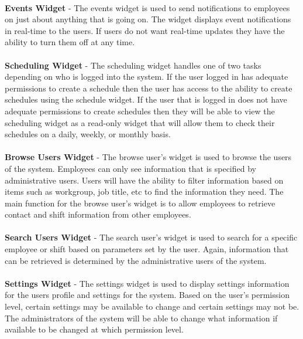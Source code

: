 \documentclass[letterpaper,12pt]{report}
\begin{document}
\paragraph*{}\hspace{0.6cm}\textbf{Events Widget} - The events widget is used to send notifications to employees on just about anything that is going on. The widget displays event notifications in real-time to the users. If users do not want real-time updates they have the ability to turn them off at any time.
\paragraph*{}\hspace{0.6cm}\textbf{Scheduling Widget} - The scheduling widget handles one of two tasks depending on who is logged into the system. If the user logged in has adequate permissions to create a schedule then the user has access to the ability to create schedules using the schedule widget. If the user that is logged in does not have adequate permissions to create schedules then they will be able to view the scheduling widget as a read-only widget that will allow them to check their schedules on a daily, weekly, or monthly basis.
\paragraph*{}\hspace{0.6cm}\textbf{Browse Users Widget} - The browse user’s widget is used to browse the users of the system. Employees can only see information that is specified by administrative users. Users will have the ability to filter information based on items such as workgroup, job title, etc to find the information they need. The main function for the browse user’s widget is to allow employees to retrieve contact and shift information from other employees.
\paragraph*{}\hspace{0.6cm}\textbf{Search Users Widget} - The search user’s widget is used to search for a specific employee or shift based on parameters set by the user. Again, information that can be retrieved is determined by the administrative users of the system.
\paragraph*{}\hspace{0.6cm}\textbf{Settings Widget} - The settings widget is used to display settings information for the users profile and settings for the system. Based on the user’s permission level, certain settings may be available to change and certain settings may not be. The administrators of the system will be able to change what information if available to be changed at which permission level.
\end{document}
